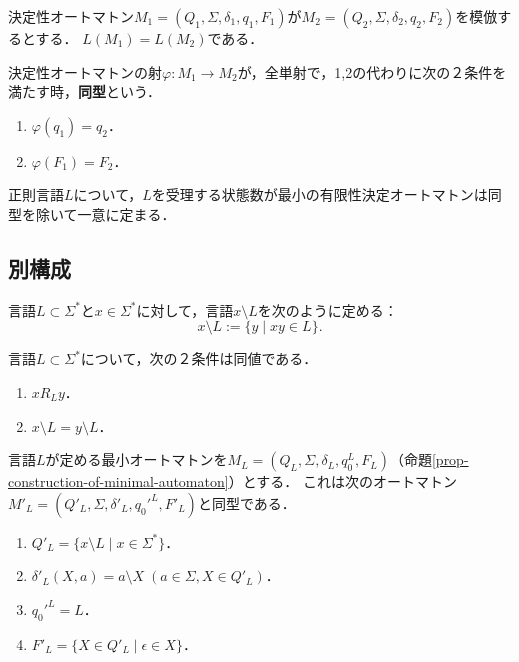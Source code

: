 \begin{proposition}
    決定性オートマトン$M_1=(Q_1,\Sigma,\delta_1,q_1,F_1)$が$M_2=(Q_2,\Sigma,\delta_2,q_2,F_2)$を模倣するとする．
    $L(M_1)=L(M_2)$である．
\end{proposition}

\begin{definition}[isomorphism]
    決定性オートマトンの射$\varphi:M_1\to M_2$が，全単射で，1,2の代わりに次の２条件を満たす時，\textbf{同型}という．
    \begin{enumerate}
        \item $\varphi(q_1)=q_2$．
        \item $\varphi(F_1)=F_2$．
    \end{enumerate}
\end{definition}

\begin{theorem}[最小オートマトンの同型を除いた一意性]
    正則言語$L$について，$L$を受理する状態数が最小の有限性決定オートマトンは同型を除いて一意に定まる．
\end{theorem}

\subsection{別構成}

\begin{definition}
    言語$L\subset\Sigma^*$と$x\in\Sigma^*$に対して，言語$x\setminus L$を次のように定める：
    \[ x\setminus L:=\{y\mid xy\in L\}. \]
\end{definition}

\begin{proposition}
    言語$L\subset\Sigma^*$について，次の２条件は同値である．
    \begin{enumerate}
        \item $xR_Ly$．
        \item $x\setminus L=y\setminus L$．
    \end{enumerate}
\end{proposition}

\begin{theorem}
    言語$L$が定める最小オートマトンを$M_L=(Q_L,\Sigma,\delta_L,q_0^L,F_L)$（命題\ref{prop-construction-of-minimal-automaton}）とする．
    これは次のオートマトン$M'_L=(Q'_L,\Sigma,\delta'_L,q_0'^L,F'_L)$と同型である．
    \begin{enumerate}
        \item $Q'_L=\{x\setminus L\mid x\in\Sigma^*\}$．
        \item $\delta'_L(X,a)=a\setminus X\;(a\in\Sigma,X\in Q'_L)$．
        \item $q_0'^L=L$．
        \item $F'_L=\{X\in Q'_L\mid \epsilon\in X\}$．
    \end{enumerate}
\end{theorem}

